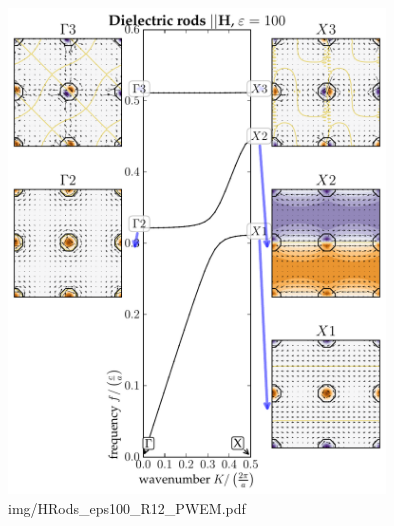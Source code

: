 \begin{figure} \caption{img/HRods\_eps100\_R12\_PWEM.pdf}  \centering \includegraphics[width=10cm]{img/HRods_eps100_R12_PWEM.pdf} \end{figure} \clearpage
